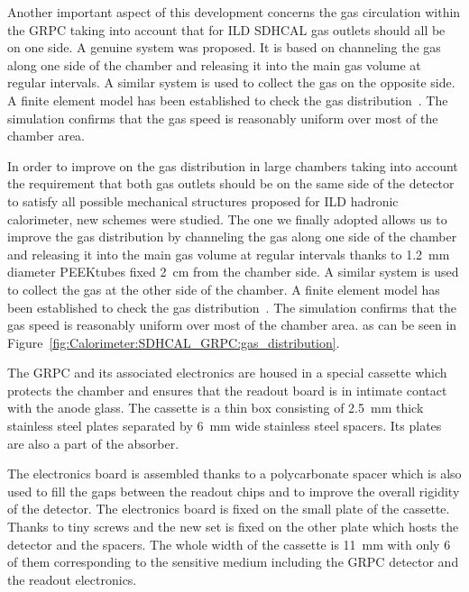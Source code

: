 Another important aspect of this development concerns the gas circulation within
the GRPC taking into account that for ILD SDHCAL gas outlets should all be on
one side. A genuine system was proposed. It is based on channeling the gas
along one side of the chamber and releasing it into the main gas volume at
regular intervals. A similar system is used to collect the gas on the opposite
side. A finite element model has been established to check the gas
distribution~\cite{Bedjidian2010120}. The simulation confirms that the gas speed is
reasonably uniform over most of the chamber area.


In order to improve on the gas distribution in large chambers taking into
account the requirement that both gas outlets should be on the same side of the
detector to satisfy all possible mechanical structures proposed for ILD
hadronic calorimeter, new schemes were studied. The one we finally adopted
allows us to improve the gas distribution by channeling the gas along one side
of the chamber and releasing it into the main gas volume at regular intervals
thanks to \SI{1.2}{mm} diameter PEEK\texttrademark tubes fixed \SI{2}{cm} from the
chamber side. A similar system is used to collect the gas at the other side of
the chamber. A finite element model has been established to check the gas
distribution~\cite{Bedjidian2010120}. The simulation confirms that the gas speed is
reasonably uniform over most of the chamber area. as can be seen in
Figure~\ref{fig:Calorimeter:SDHCAL_GRPC:gas_distribution}.

The GRPC and its associated electronics are housed in a special cassette which
protects the chamber and ensures that the readout board is in intimate contact
with the anode glass. The cassette is a thin box consisting of \SI{2.5}{mm} thick
stainless steel plates separated by \SI{6}{mm} wide stainless steel spacers. Its
plates are also a part of the absorber.

The electronics board is assembled thanks to a polycarbonate spacer which is
also used to fill the gaps between the readout chips and to improve the overall
rigidity of the detector. The electronics board is fixed on the small plate of
the cassette. Thanks to tiny screws and the new set is fixed on the other plate
which hosts the detector and the spacers. The whole width of the cassette is \SI{11}{mm}
with only 6 of them corresponding to the sensitive medium including the GRPC
detector and the readout electronics.


